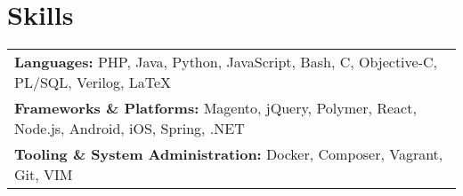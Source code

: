 \documentclass[line]{resume}
\begin{document}
\vspace{-2px}
\section{Skills}
\vspace{-1px}
\begin{tabularx}{\linewidth}{X}
	\textbf{Languages:} PHP, Java, Python, JavaScript, Bash, C, Objective-C, PL/SQL, Verilog, \LaTeX \\
	\textbf{Frameworks \& Platforms:} Magento, jQuery, Polymer, React, Node.js, Android, iOS, Spring, .NET \\
	\textbf{Tooling \& System Administration:} Docker, Composer, Vagrant, Git, VIM \\
\end{tabularx}
\end{document}
